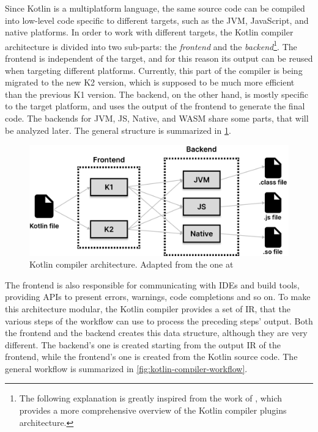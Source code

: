 \documentclass[12pt,a4paper,openright,twoside]{book}
\begin{document}
Since Kotlin is a multiplatform language, the same source code can be compiled
into low-level code specific to different targets, such as the JVM, JavaScript,
and native platforms. In order to work with different targets, the Kotlin
compiler architecture is divided into two sub-parts: the \emph{frontend} and the
\emph{backend}\footnote{The following explanation is greatly
inspired from the work of \cite{moskala2023}, which provides a more
comprehensive overview of the Kotlin compiler plugins architecture.}.
%
The frontend is independent of the target, and for this reason its output can be 
reused when targeting different platforms. Currently, this part of the compiler 
is being migrated to the new K2 version, which is supposed to be much more 
efficient than the previous K1 version.
%
The backend, on the other hand, is mostly specific to the target platform, and
uses the output of the frontend to generate the final code. The backends for
JVM, JS, Native, and WASM share some parts, that will be analyzed later. The
general structure is summarized in \cref{fig:kotlin-compiler-architecture}.

\begin{figure}
  \centering
  \includegraphics[width=.8\linewidth]{figures/kotlin-compiler-architecture.pdf}
  \caption{Kotlin compiler architecture. Adapted from the one at \cite{moskala2023}}
  \label{fig:kotlin-compiler-architecture}
\end{figure}

The frontend is also responsible for communicating with IDEs and build tools, 
providing APIs to present errors, warnings, code completions and so on. 
%
To make this architecture modular, the Kotlin compiler provides a set of 
\ac{IR}, that the various steps of the workflow
can use to process the preceding steps' output. Both the frontend and the
backend creates this data structure, although they are very different. The 
backend's one is created starting from the output \ac{IR} of the frontend,
while the frontend's one is created from the Kotlin source code. 
The general workflow is summarized in \cref{fig:kotlin-compiler-workflow}.
\end{document}
